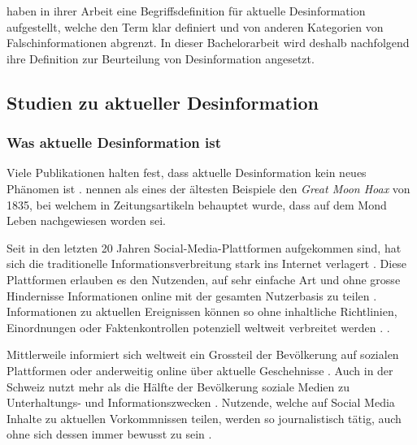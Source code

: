 \documentclass[12pt,a4paper]{article}        %
\begin{document}
\citeauthor{marx_fake_2020} haben in ihrer Arbeit eine Begriffsdefinition für aktuelle Desinformation aufgestellt, welche den Term klar definiert und von anderen Kategorien von Falschinformationen abgrenzt. In dieser Bachelorarbeit wird deshalb nachfolgend ihre Definition zur Beurteilung von Desinformation angesetzt.

\subsection{Studien zu aktueller Desinformation}
\subsubsection{Was aktuelle Desinformation ist}
Viele Publikationen halten fest, dass aktuelle Desinformation kein neues Phänomen ist \parencites[vgl.\ bspw.][2]{tandoc_jr_facts_2019}[214]{allcott_social_2017}[1094]{lazer_science_2018}. \textcite[214]{allcott_social_2017} nennen als eines der ältesten Beispiele den \textit{Great Moon Hoax} von 1835, bei welchem in Zeitungsartikeln behauptet wurde, dass auf dem Mond Leben nachgewiesen worden sei.

Seit in den letzten 20 Jahren Social-Media-Plattformen aufgekommen sind, hat sich die traditionelle Informationsverbreitung stark ins Internet verlagert \parencites[211]{allcott_social_2017}[147]{marx_fake_2020}[138]{tandoc_jr_defining_2018}[1094]{lazer_science_2018}. Diese Plattformen erlauben es den Nutzenden, auf sehr einfache Art und ohne grosse Hindernisse Informationen online mit der gesamten Nutzerbasis zu teilen \parencites[1]{vogler_wahrnehmung_2021}{lazer_science_2018}. Informationen zu aktuellen Ereignissen können so ohne inhaltliche Richtlinien, Einordnungen oder Faktenkontrollen potenziell weltweit verbreitet werden \parencites[147]{marx_fake_2020}[211]{allcott_social_2017}[4]{ceron_fake_2021}[165f]{wahl_fake_2021}.  \parencite[211]{allcott_social_2017}.

Mittlerweile informiert sich weltweit ein Grossteil der Bevölkerung auf sozialen Plattformen oder anderweitig online über aktuelle Geschehnisse \parencite[212]{allcott_social_2017}. Auch in der Schweiz nutzt mehr als die Hälfte der Bevölkerung soziale Medien zu Unterhaltungs- und Informationszwecken \parencite[21ff]{we_are_social_anteil_2024}. Nutzende, welche auf Social Media Inhalte zu aktuellen Vorkommnissen teilen, werden so journalistisch tätig, auch ohne sich dessen immer bewusst zu sein \parencite[139]{tandoc_jr_defining_2018}.
\end{document}
